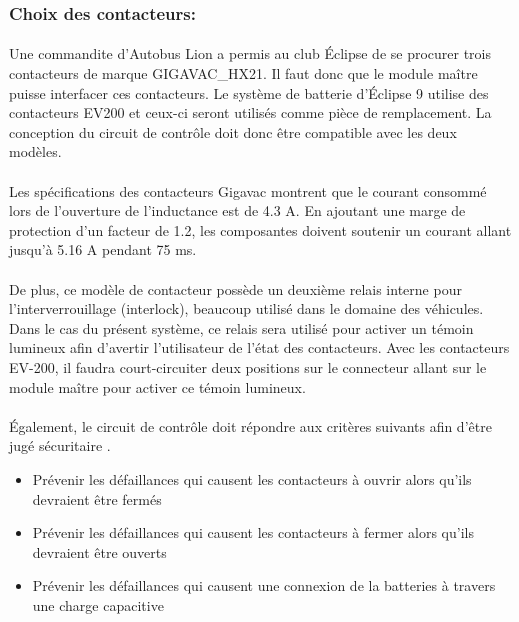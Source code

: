 	\subsubsection*{Choix des contacteurs:}
		\paragraph*{}
		Une commandite d'Autobus Lion a permis au club Éclipse de se procurer trois contacteurs de marque GIGAVAC\_HX21. Il faut donc que le module maître puisse interfacer ces contacteurs. Le système de batterie d'Éclipse 9 utilise des contacteurs EV200 et ceux-ci seront utilisés comme pièce de remplacement. La conception du circuit de contrôle doit donc être compatible avec les deux modèles.

		\paragraph*{}
		Les spécifications des contacteurs Gigavac montrent que le courant consommé lors de l'ouverture de l'inductance est de 4.3 A. En ajoutant une marge de protection d'un facteur de 1.2, les composantes doivent soutenir un courant allant jusqu'à 5.16 A pendant 75 ms\cite{GigavacHX21}. 

		\paragraph*{}
		De plus, ce modèle de contacteur possède un deuxième relais interne pour l'interverrouillage (interlock), beaucoup utilisé dans le domaine des véhicules. Dans le cas du présent système, ce relais sera utilisé pour activer un témoin lumineux afin d'avertir l'utilisateur de l'état des contacteurs. Avec les contacteurs EV-200, il faudra court-circuiter deux positions sur le connecteur allant sur le module maître pour activer ce témoin lumineux.

		\paragraph*{}
		Également, le circuit de contrôle doit répondre aux critères suivants afin d'être jugé sécuritaire \cite{System_Approach}.

		\begin{itemize}
			\item Prévenir les défaillances qui causent les contacteurs à ouvrir alors qu'ils devraient être fermés
			\item Prévenir les défaillances qui causent les contacteurs à fermer alors qu'ils devraient être ouverts
			\item Prévenir les défaillances qui causent une connexion de la batteries à travers une charge capacitive	
		\end{itemize}


